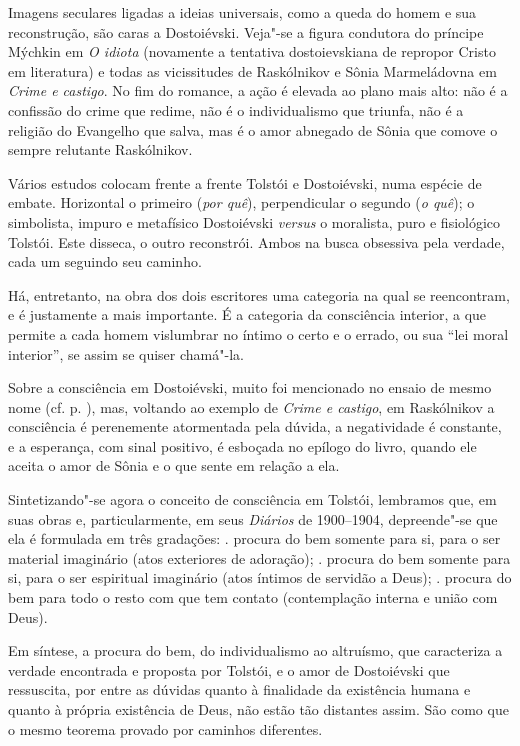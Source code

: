 Imagens seculares ligadas a ideias universais, como a queda do homem e sua reconstrução, são caras a Dostoiévski. Veja"-se a figura condutora do príncipe Mýchkin em \emph{O idiota} (novamente a tentativa dostoievskiana de repropor Cristo em literatura) e todas as vicissitudes de Raskólnikov e Sônia Marmeládovna em \emph{Crime e castigo}. No fim do romance, a ação é elevada ao plano mais alto: não é a confissão do crime que redime, não é o individualismo que triunfa, não é a religião do Evangelho que salva, mas é o amor abnegado de Sônia que comove o sempre relutante Raskólnikov.

Vários estudos colocam frente a frente Tolstói e Dostoiévski, numa espécie de embate. Horizontal o primeiro (\emph{por quê}), perpendicular o segundo (\emph{o quê}); o simbolista, impuro e metafísico Dostoiévski \emph{versus} o moralista, puro e fisiológico Tolstói. Este disseca, o outro reconstrói. Ambos na busca obsessiva pela verdade, cada um seguindo seu caminho.

Há, entretanto, na obra dos dois escritores
uma categoria na qual se reencontram, e é justamente a mais importante. É a
categoria da consciência interior, a que permite a cada homem vislumbrar
no íntimo o certo e o errado, ou sua ``lei moral interior'', se assim
se quiser chamá"-la.

Sobre a consciência em Dostoiévski, muito foi mencionado no
ensaio de mesmo nome (cf. p. \pageref{crimecastigo}), mas, voltando ao
exemplo de \emph{Crime e castigo}, em Raskólnikov a consciência
é perenemente atormentada pela dúvida, a negatividade é constante,
e a esperança, com sinal positivo, é esboçada no epílogo do livro,
quando ele aceita o amor de Sônia e o que sente em relação a ela.

Sintetizando"-se agora o conceito de consciência em Tolstói, lembramos que, em suas obras e, particularmente, em seus \emph{Diários} de 1900--1904, depreende"-se que ela é formulada em três gradações: . procura do bem somente para si, para o ser material imaginário (atos exteriores de adoração); . procura do bem somente para si, para o ser espiritual imaginário (atos íntimos de servidão a Deus); . procura do bem para todo o resto com que tem contato (contemplação interna e união com Deus).

Em síntese, a procura do bem, do individualismo ao altruísmo, que caracteriza a verdade encontrada e proposta por Tolstói, e o amor de Dostoiévski que ressuscita, por entre as dúvidas quanto à finalidade da existência humana e quanto à própria existência de Deus, não estão tão distantes assim. São como que o mesmo teorema provado por caminhos diferentes.


